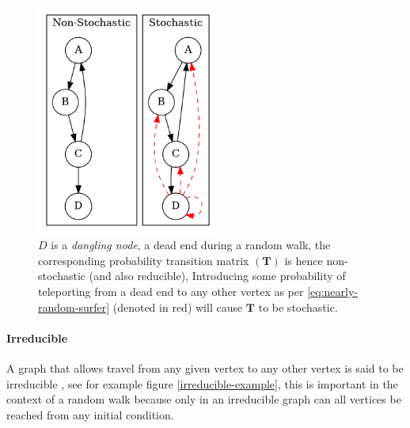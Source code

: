 \documentclass[11pt]{article}
\begin{document}
\begin{figure}[htbp]
\centering
\includegraphics[width=6cm]{media/dot/stochastic_graph_example.dot.png}
\caption{\label{fig:stochastic-example}\(D\) is a \emph{dangling node}, a dead end during a random walk, the corresponding probability transition matrix \((\mathbf{T})\) is hence non-stochastic (and also reducible), Introducing some probability of teleporting from a dead end to any other vertex as per \eqref{eq:nearly-random-surfer} (denoted in red) will cause \(\mathbf{T}\) to be stochastic.}
\end{figure}

\paragraph{Irreducible}
\label{sec:org28a256a}
A graph that allows travel from any given vertex to any other vertex is said to be irreducible \cite{langvilleGooglePageRankScience2012}, see for example figure \ref{irreducible-example}, this is important in the context of a random walk because only in an irreducible graph can all vertices be reached from any initial condition.
\end{document}
